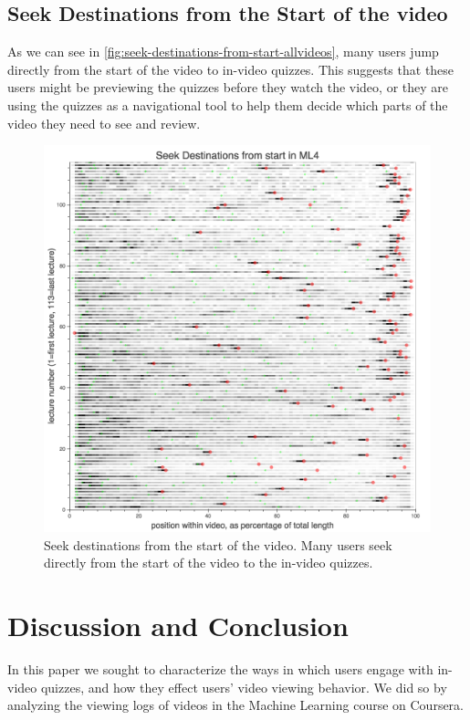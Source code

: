 \documentclass{sigchi}
\begin{document}
\subsection{Seek Destinations from the Start of the video}

As we can see in \autoref{fig:seek-destinations-from-start-allvideos}, many users jump directly from the start of the video to in-video quizzes. This suggests that these users might be previewing the quizzes before they watch the video, or they are using the quizzes as a navigational tool to help them decide which parts of the video they need to see and review.

\begin{figure}
\includegraphics[width=1.0\columnwidth]{seek-destinations-from-start-allvideos}
\caption{Seek destinations from the start of the video. Many users seek directly from the start of the video to the in-video quizzes.}
\label{fig:seek-destinations-from-start-allvideos}
\end{figure}

\section{Discussion and Conclusion}

In this paper we sought to characterize the ways in which users engage with in-video quizzes, and how they effect users' video viewing behavior. We did so by analyzing the viewing logs of videos in the Machine Learning course on Coursera.
\end{document}

